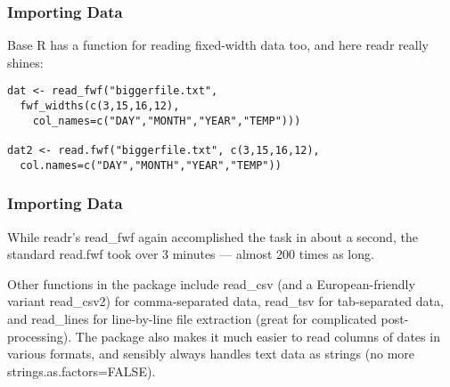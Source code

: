 \begin{frame}
\frametitle{Importing Data}
\large

Base R has a function for reading fixed-width data too, and here readr really shines:
\begin{framed}
\begin{verbatim}
dat <- read_fwf("biggerfile.txt", 
  fwf_widths(c(3,15,16,12),
    col_names=c("DAY","MONTH","YEAR","TEMP")))

dat2 <- read.fwf("biggerfile.txt", c(3,15,16,12),
  col.names=c("DAY","MONTH","YEAR","TEMP"))

\end{verbatim}
\end{framed}
\end{frame}
\begin{frame}
\frametitle{Importing Data}
\large

While readr's read_fwf again accomplished the task in about a second, the standard read.fwf took over 3 minutes — almost 200 times as long.

Other functions in the package include read_csv (and a European-friendly variant read_csv2) for comma-separated data, read_tsv for tab-separated data, and read_lines for line-by-line file extraction (great for complicated post-processing). The package also makes it much easier to read columns of dates in various formats, and sensibly always handles text data as strings (no more strings.as.factors=FALSE). 

\end{frame}





